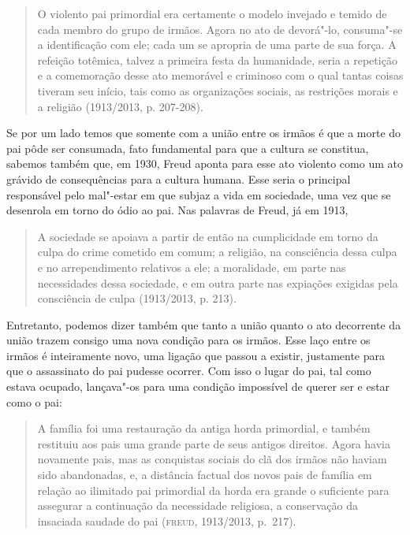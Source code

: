 \begin{quote}
O violento pai primordial era certamente o modelo invejado e temido de
cada membro do grupo de irmãos. Agora no ato de devorá"-lo, consuma"-se a
identificação com ele; cada um se apropria de uma parte de sua força. A
refeição totêmica, talvez a primeira festa da humanidade, seria a
repetição e a comemoração desse ato memorável e criminoso com o qual
tantas coisas tiveram seu início, tais como as organizações sociais, as
restrições morais e a religião (1913/2013, p. 207-208).
\end{quote}

Se por um lado temos que somente com a união entre os irmãos é que a
morte do pai pôde ser consumada, fato fundamental para que a cultura se
constitua, sabemos também que, em 1930, Freud aponta para esse ato
violento como um ato grávido de consequências para a cultura humana.
Esse seria o principal responsável pelo mal"-estar em que subjaz a vida
em sociedade, uma vez que se desenrola em torno do ódio ao pai. Nas
palavras de Freud, já em 1913,

\begin{quote}
A sociedade se apoiava a partir de então na cumplicidade em torno da
culpa do crime cometido em comum; a religião, na consciência dessa culpa
e no arrependimento relativos a ele; a moralidade, em parte nas
necessidades dessa sociedade, e em outra parte nas expiações exigidas
pela consciência de culpa (1913/2013, p. 213).
\end{quote}

Entretanto, podemos dizer também que tanto a união quanto o ato
decorrente da união trazem consigo uma nova condição para os irmãos.
Esse laço entre os irmãos é inteiramente novo, uma ligação que passou a
existir, justamente para que o assassinato do pai pudesse ocorrer. Com
isso o lugar do pai, tal como estava ocupado, lançava"-os para uma
condição impossível de querer ser e estar como o pai:

\begin{quote}
A família foi uma restauração da antiga horda primordial, e também
restituiu aos pais uma grande parte de seus antigos direitos. Agora
havia novamente pais, mas as conquistas sociais do clã dos irmãos não
haviam sido abandonadas, e, a distância factual dos novos pais de
família em relação ao ilimitado pai primordial da horda era grande o
suficiente para assegurar a continuação da necessidade religiosa, a
conservação da insaciada saudade do pai (\textsc{freud}, 1913/2013, p.~217).
\end{quote}

